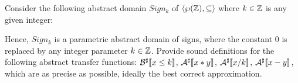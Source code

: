 \begin{exercise}{
    Consider the following abstract domain $Sign_k$ of $\left<\wp(\mathbb{Z}), \subseteq\right>$ where $k \in \mathbb{Z}$ is any given integer:
    \begin{center}
    \end{center}
    Hence, $Sign_k$ is a parametric abstract domain of signs, where the constant 0 is replaced by any integer parameter $k \in \mathbb{Z}$. Provide sound definitions for the following abstract transfer functions: $\mathcal{B}^\sharp \llbracket x \leq k \rrbracket$, $\mathcal{A}^\sharp \llbracket x * y \rrbracket$, $\mathcal{A}^\sharp \llbracket x / k \rrbracket$, $\mathcal{A}^\sharp \llbracket x - y \rrbracket$, which are as precise as possible, ideally the best correct approximation.
}
    
\end{exercise}
